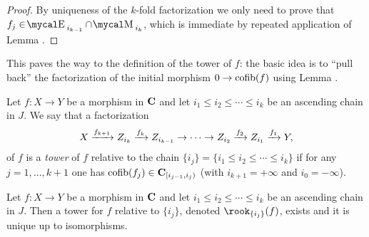 \begin{proof}
By uniqueness of the $k$\hyp{}fold factorization we only need to prove that $f_j\in \EE_{i_{k-1}}\cap \MM_{i_k}$, which is immediate by repeated application of Lemma . 
\end{proof}
This paves the way to the definition of the tower of $f$: the basic idea is to ``pull back'' the factorization of the initial morphism $0\to \text{cofib}(f)$ using Lemma .
\begin{definition} \label{tower.of.f}Let $f\colon X\to Y$ be a morphism in $\textbf{C}$ and let $i_1\leq i_2\leq\cdots \leq i_k$ be an ascending chain in $J$. We say that a factorization 
\[
X \xrightarrow{f_{k+1}} Z_{i_k} \xrightarrow{f_k}Z_{i_{k-1}}\to\dots\to Z_{i_{2}} \xrightarrow{f_2} Z_{i_1} \xrightarrow{f_1} Y,
\]
of $f$ is a \emph{tower} of $f$ relative to the chain $\{i_j\} = \{i_1\leq i_2\leq\cdots \leq i_k\}$ if for any $j=1,\dots,k+1$ one has
$\text{cofib}(f_j)\in \textbf{C}_{[i_{j-1},i_j)}$ (with $i_{k+1}=+\infty$ and $i_0=-\infty$).
\end{definition}
\begin{proposition}\label{prop:perPostnikov} Let $f\colon X\to Y$ be a morphism in $\textbf{C}$ and let $i_1\leq i_2\leq\cdots \leq i_k$ be an ascending chain in $J$. Then a tower for $f$ relative to $\{i_j\}$, denoted $\rook_{\{i_j\}}(f)$, exists and it is unique up to isomorphisms.
\end{proposition}
